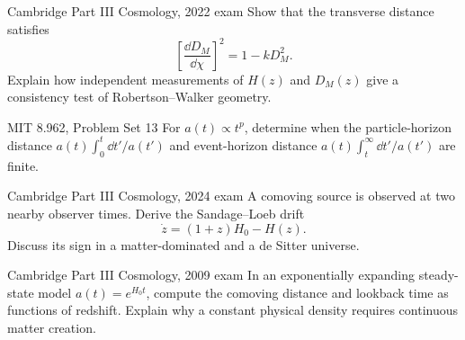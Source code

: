 \begin{exercises}
\begin{exercise}{Cambridge Part III Cosmology, 2022 exam}
Show that the transverse distance satisfies
\[
\left[\frac{\dd D_M}{\dd\chi}\right]^2=1-kD_M^2.
\]
Explain how independent measurements of \(H(z)\) and \(D_M(z)\) give a
consistency test of Robertson--Walker geometry.
\end{exercise}

\begin{exercise}{MIT 8.962, Problem Set 13}
For \(a(t)\propto t^p\), determine when the particle-horizon distance
\(a(t)\int_0^t\dd t'/a(t')\) and event-horizon distance
\(a(t)\int_t^\infty\dd t'/a(t')\) are finite.
\end{exercise}

\begin{exercise}{Cambridge Part III Cosmology, 2024 exam}
A comoving source is observed at two nearby observer times.  Derive the
Sandage--Loeb drift
\[
\dot z=(1+z)H_0-H(z).
\]
Discuss its sign in a matter-dominated and a de Sitter universe.
\end{exercise}

\begin{exercise}{Cambridge Part III Cosmology, 2009 exam}
In an exponentially expanding steady-state model \(a(t)=e^{H_0t}\), compute
the comoving distance and lookback time as functions of redshift.  Explain why
a constant physical density requires continuous matter creation.
\end{exercise}



\end{exercises}


